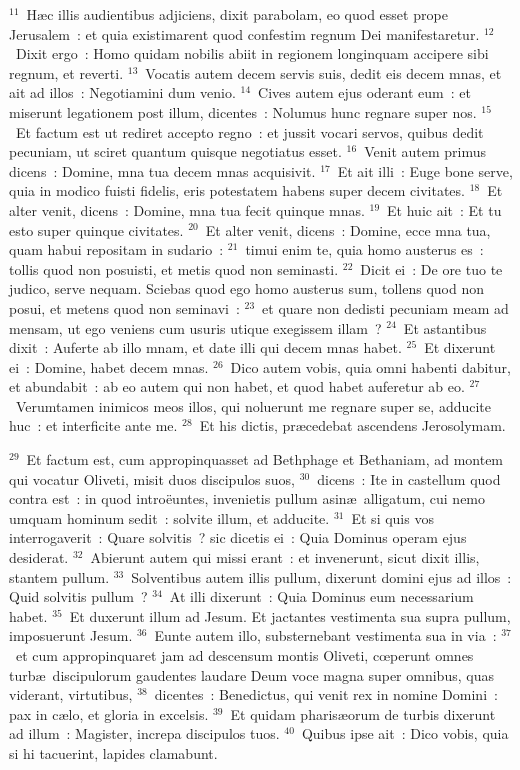 ${}^{11}$~H\ae c illis audientibus adjiciens, dixit parabolam, eo quod esset prope Jerusalem~: et quia existimarent quod confestim regnum Dei manifestaretur.
${}^{12}$~Dixit ergo~: Homo quidam nobilis abiit in regionem longinquam accipere sibi regnum, et reverti.
${}^{13}$~Vocatis autem decem servis suis, dedit eis decem mnas, et ait ad illos~: Negotiamini dum venio.
${}^{14}$~Cives autem ejus oderant eum~: et miserunt legationem post illum, dicentes~: Nolumus hunc regnare super nos.
${}^{15}$~Et factum est ut rediret accepto regno~: et jussit vocari servos, quibus dedit pecuniam, ut sciret quantum quisque negotiatus esset.
${}^{16}$~Venit autem primus dicens~: Domine, mna tua decem mnas acquisivit.
${}^{17}$~Et ait illi~: Euge bone serve, quia in modico fuisti fidelis, eris potestatem habens super decem civitates.
${}^{18}$~Et alter venit, dicens~: Domine, mna tua fecit quinque mnas.
${}^{19}$~Et huic ait~: Et tu esto super quinque civitates.
${}^{20}$~Et alter venit, dicens~: Domine, ecce mna tua, quam habui repositam in sudario~:
${}^{21}$~timui enim te, quia homo austerus es~: tollis quod non posuisti, et metis quod non seminasti.
${}^{22}$~Dicit ei~: De ore tuo te judico, serve nequam. Sciebas quod ego homo austerus sum, tollens quod non posui, et metens quod non seminavi~:
${}^{23}$~et quare non dedisti pecuniam meam ad mensam, ut ego veniens cum usuris utique exegissem illam~?
${}^{24}$~Et astantibus dixit~: Auferte ab illo mnam, et date illi qui decem mnas habet.
${}^{25}$~Et dixerunt ei~: Domine, habet decem mnas.
${}^{26}$~Dico autem vobis, quia omni habenti dabitur, et abundabit~: ab eo autem qui non habet, et quod habet auferetur ab eo.
${}^{27}$~Verumtamen inimicos meos illos, qui noluerunt me regnare super se, adducite huc~: et interficite ante me.
${}^{28}$~Et his dictis, pr\ae cedebat ascendens Jerosolymam.


${}^{29}$~Et factum est, cum appropinquasset ad Bethphage et Bethaniam, ad montem qui vocatur Oliveti, misit duos discipulos suos,
${}^{30}$~dicens~: Ite in castellum quod contra est~: in quod intro\"euntes, invenietis pullum asin\ae\ alligatum, cui nemo umquam hominum sedit~: solvite illum, et adducite.
${}^{31}$~Et si quis vos interrogaverit~: Quare solvitis~? sic dicetis ei~: Quia Dominus operam ejus desiderat.
${}^{32}$~Abierunt autem qui missi erant~: et invenerunt, sicut dixit illis, stantem pullum.
${}^{33}$~Solventibus autem illis pullum, dixerunt domini ejus ad illos~: Quid solvitis pullum~?
${}^{34}$~At illi dixerunt~: Quia Dominus eum necessarium habet.
${}^{35}$~Et duxerunt illum ad Jesum. Et jactantes vestimenta sua supra pullum, imposuerunt Jesum.
${}^{36}$~Eunte autem illo, substernebant vestimenta sua in via~:
${}^{37}$~et cum appropinquaret jam ad descensum montis Oliveti, cœperunt omnes turb\ae\ discipulorum gaudentes laudare Deum voce magna super omnibus, quas viderant, virtutibus,
${}^{38}$~dicentes~: Benedictus, qui venit rex in nomine Domini~: pax in c\ae lo, et gloria in excelsis.
${}^{39}$~Et quidam pharis\ae orum de turbis dixerunt ad illum~: Magister, increpa discipulos tuos.
${}^{40}$~Quibus ipse ait~: Dico vobis, quia si hi tacuerint, lapides clamabunt.


